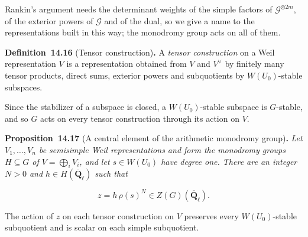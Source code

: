 \documentclass[11pt]{article}
\newenvironment{bpstatement}[2]{\par\addvspace{0.6\baselineskip}\noindent\textbf{#1}#2\textbf{.}\enspace\ignorespaces}
  {\par\addvspace{0.4\baselineskip}}
\newenvironment{bpstatementit}[2]{\begin{bpstatement}{#1}{#2}\itshape\ignorespaces}{\end{bpstatement}}
\begin{document}
\label{bp89}%
Rankin's argument needs the determinant weights of the simple factors of \(\mathcal G^{\otimes2m}\), of the exterior powers of \(\mathcal G\) and of the dual, so we give a name to the representations built in this way; the monodromy group acts on all of them.

\label{bp90}%
\begin{bpstatement}{Definition~14.16}{ (Tensor construction)}
A \emph{tensor construction} on a Weil representation \(V\) is a representation obtained from \(V\) and \(V^\vee\) by finitely many tensor products, direct sums, exterior powers and subquotients by \(W(U_0)\)-stable subspaces.
\end{bpstatement}

\label{bp91}%
Since the stabilizer of a subspace is closed, a \(W(U_0)\)-stable subspace is \(G\)-stable, and so \(G\) acts on every tensor construction through its action on \(V\).

\label{bp92}%
\begin{bpstatementit}{Proposition~14.17}{ (A central element of the arithmetic monodromy group)}
Let \(V_1,\ldots,V_n\) be semisimple Weil representations and form the monodromy groups \(H\subseteq G\) of \(V=\bigoplus_iV_i\), and let \(s\in W(U_0)\) have degree one. There are an integer \(N>0\) and \(h\in H(\overline{\mathbf Q}_\ell)\) such that

\[
z=h\,\rho(s)^N\in Z(G)(\overline{\mathbf Q}_\ell).
\]

The action of \(z\) on each tensor construction on \(V\) preserves every \(W(U_0)\)-stable subquotient and is scalar on each simple subquotient.
\end{bpstatementit}
\end{document}
